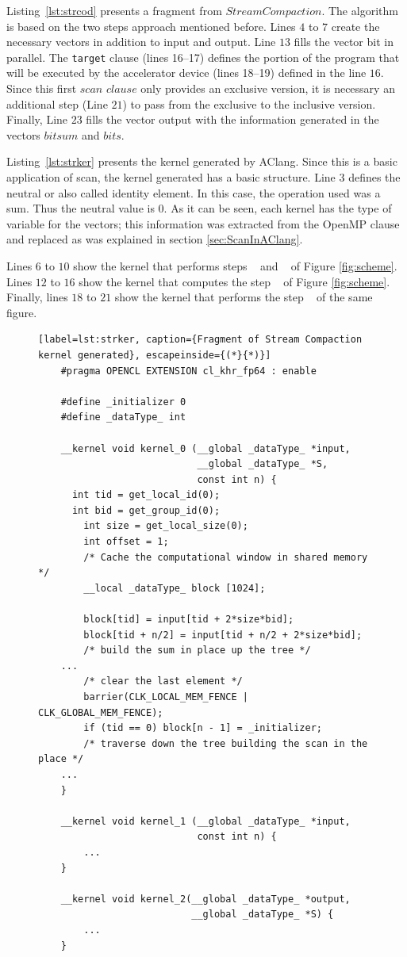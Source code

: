 \documentclass[Ingles]{ic-tese-v1}
\newcommand{\ttt}[1]{{\texttt{#1}}}
\newcommand{\rlst}[1]{Listing~\ref{lst:#1}}
\begin{document}
\rlst{strcod}  presents a fragment from $Stream Compaction$. The algorithm is based on the two steps approach mentioned before.
Lines $4$ to $7$ create the necessary vectors in addition to input and output.
Line $13$ fills the vector bit in parallel. The \ttt{target} clause (lines 16--17) defines the portion of the program  that will be executed by the accelerator device (lines 18--19) defined in the line $16$.
Since this first $scan$ $clause$ only provides an exclusive version, it is necessary an additional step (Line $21$) to pass from the exclusive to the inclusive version. Finally, Line $23$ fills the vector output with the information generated in the vectors $bitsum$ and $bits$.

\rlst{strker} presents the kernel generated by AClang. Since this is  a basic application of scan, the kernel generated has a basic structure. Line $3$ defines the neutral or also called identity element. In this case, the operation used was a sum. Thus the neutral value is $0$. As it can be seen, each kernel has the type of variable for the vectors; this information was extracted from the OpenMP clause and replaced as was explained in  section \ref{sec:ScanInAClang}.

Lines $6$ to $10$ show the kernel that performs steps ~ and ~ of Figure \ref{fig:scheme}. Lines $12$ to $16$ show the kernel that computes the step ~ of Figure \ref{fig:scheme}. Finally, lines $18$ to $21$ show the kernel that performs the step ~ of the same figure.

\begin{figure}[t]
	\lstset{basicstyle=\scriptsize}
	\begin{lstlisting}[label=lst:strker, caption={Fragment of Stream Compaction kernel generated}, escapeinside={(*}{*)}]
	#pragma OPENCL EXTENSION cl_khr_fp64 : enable

	#define _initializer 0
    #define _dataType_ int

	__kernel void kernel_0 (__global _dataType_ *input,
	                        __global _dataType_ *S,
	                        const int n) {
      int tid = get_local_id(0);
      int bid = get_group_id(0);
	    int size = get_local_size(0);
	    int offset = 1;
 	    /* Cache the computational window in shared memory */
 	    __local _dataType_ block [1024];

 	    block[tid] = input[tid + 2*size*bid];
 	    block[tid + n/2] = input[tid + n/2 + 2*size*bid];
 	    /* build the sum in place up the tree */
    ...
        /* clear the last element */
	    barrier(CLK_LOCAL_MEM_FENCE | CLK_GLOBAL_MEM_FENCE);
	    if (tid == 0) block[n - 1] = _initializer;
	    /* traverse down the tree building the scan in the place */
    ...
	}

	__kernel void kernel_1 (__global _dataType_ *input,
	                        const int n) {
	    ...
	}

	__kernel void kernel_2(__global _dataType_ *output,
                           __global _dataType_ *S) {
	    ...
	}
	\end{lstlisting}
\end{figure}
\end{document}
